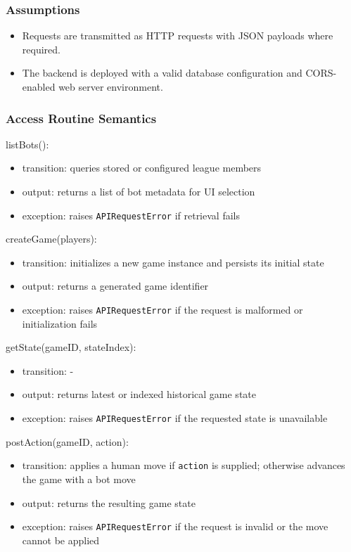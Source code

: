 \documentclass[12pt, titlepage]{article}
\begin{document}
\subsubsection{Assumptions}
\begin{itemize}
    \item Requests are transmitted as HTTP requests with JSON payloads where required.
    \item The backend is deployed with a valid database configuration and CORS-enabled web server environment.
\end{itemize}

\subsubsection{Access Routine Semantics}

\noindent listBots():
\begin{itemize}
\item transition: queries stored or configured league members
\item output: returns a list of bot metadata for UI selection
\item exception: raises \texttt{APIRequestError} if retrieval fails
\end{itemize}

\noindent createGame(players):
\begin{itemize}
\item transition: initializes a new game instance and persists its initial state
\item output: returns a generated game identifier
\item exception: raises \texttt{APIRequestError} if the request is malformed or initialization fails
\end{itemize}

\noindent getState(gameID, stateIndex):
\begin{itemize}
\item transition: -
\item output: returns latest or indexed historical game state
\item exception: raises \texttt{APIRequestError} if the requested state is unavailable
\end{itemize}

\noindent postAction(gameID, action):
\begin{itemize}
\item transition: applies a human move if \texttt{action} is supplied; otherwise advances the game with a bot move
\item output: returns the resulting game state
\item exception: raises \texttt{APIRequestError} if the request is invalid or the move cannot be applied
\end{itemize}
\end{document}

